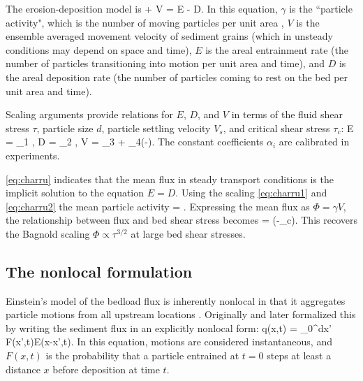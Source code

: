 The erosion-deposition model is
\be \pt \gamma +  \px V \gamma = E - D. \label{eq:charru}\ee
In this equation, $\gamma$ is the ``particle activity", which is the number of moving particles per unit area \citep{Furbish2012}, $V$ is the ensemble averaged movement velocity of sediment grains (which in unsteady conditions may depend on space and time), $E$ is the areal entrainment rate (the number of particles transitioning into motion per unit area and time), and $D$ is the areal deposition rate (the number of particles coming to rest on the bed per unit area and time).

Scaling arguments provide relations for $E$, $D$, and $V$ in terms of the fluid shear stress $\tau$, particle size $d$, particle settling velocity $V_s$, and critical shear stress $\tau_c$:
\be E = \alpha_1 , \label{eq:charru1}\ee
\be D  = \alpha_2 , \ee
\be V = \alpha_3 + \alpha_4(\sqrt{\tau}-). \label{eq:charru2}\ee
The constant coefficients $\alpha_i$ are calibrated in experiments.

\DIFdelbegin {}\DIFdelend \DIFaddbegin {}\DIFaddend \ref{eq:charru} indicates that the mean flux in steady transport \DIFaddbegin {}\DIFaddend conditions is the implicit solution to the equation $E = D.$
Using the scaling \DIFdelbegin {}\DIFdelend \DIFaddbegin {}\DIFaddend \ref{eq:charru1} and \ref{eq:charru2} \DIFdelbegin {}\DIFdelend \DIFaddbegin {}\DIFaddend the mean particle activity
\be \gamma = .\ee
Expressing the mean flux as $\Phi = \gamma V$, the relationship between flux and bed shear stress becomes
\be \Phi = \big(\tau-\tau_c\big). \ee
This recovers the Bagnold scaling $\Phi \propto \tau^{3/2}$ at large bed shear stresses.

\subsection{The nonlocal formulation}
\label{sec:nonlocal}

Einstein's model of the bedload flux is inherently nonlocal in that it aggregates particle motions from all upstream locations \citep{Schumer2009,Tucker2010a,Martin2012}. 
Originally \citet{Nakagawa1976} and later \citet{Parker2000} formalized this by writing the sediment flux in an explicitly nonlocal form:
\be q(x,t) = \int_0^\infty dx' F(x',t)E(x-x',t). \ee
In this equation, motions are considered instantaneous, and $F(x,t)$ is the probability that a particle entrained at $t=0$ steps at least a distance $x$ before deposition at time $t$.

